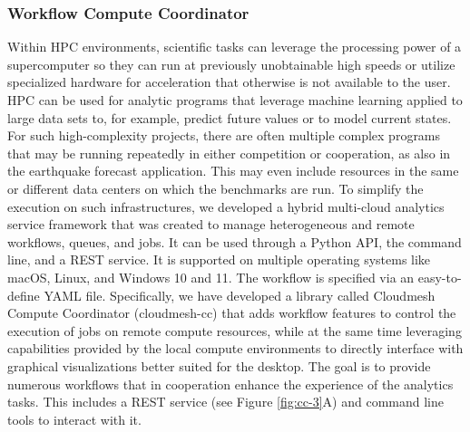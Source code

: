 \documentclass[utf8]{FrontiersinVancouver} %
\begin{document}
\subsubsection{Workflow Compute Coordinator}
\label{sec:workflow-cc}


Within HPC environments, scientific tasks can leverage the processing power of a supercomputer so they can run at previously unobtainable high speeds or utilize specialized hardware for acceleration that otherwise is not available to the user. HPC can be used for analytic programs that leverage machine learning applied to large data sets to, for example, predict future values or to model current states. For such high-complexity projects, there are often multiple complex programs that may be running repeatedly in either competition or cooperation, as also in the earthquake forecast application.  This may even include resources in the same or different data centers on which the benchmarks are run. To simplify the execution on such infrastructures, we developed a hybrid multi-cloud analytics service framework that was created to manage heterogeneous and remote workflows, queues, and jobs.  It can be used through a Python API, the command line, and a REST service. It is supported on multiple operating systems like macOS, Linux, and Windows 10 and 11.  The workflow is specified via an easy-to-define YAML file.  Specifically, we have developed a library called Cloudmesh Compute Coordinator (cloudmesh-cc) \citep{las-22-arxiv-workflow-cc} that adds workflow features to control the execution of jobs on remote compute resources, while at the same time leveraging capabilities provided by the local compute environments to directly interface with graphical visualizations better suited for the desktop. The goal is to provide numerous workflows that in cooperation enhance the experience of the analytics tasks. This includes a REST service (see Figure \ref{fig:cc-3}A) and command line tools to interact with it.
\end{document}
